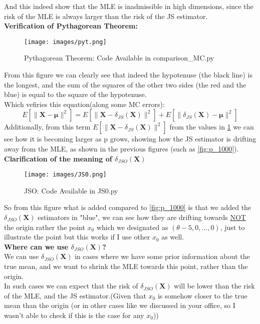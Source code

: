 \documentclass[12pt]{article}
\begin{document}
And this indeed show that the MLE is inadmissible in high dimensions, since the risk of the MLE is always larger than the risk of the JS estimator. \\
\textbf{Verification of Pythagorean Theorem:} \\
\begin{figure}[H]
  \centering 
  \texttt{[image: images/pyt.png]}
  \caption{Pythagorean Theorem: Code Available in comparison\_MC.py}
  \label{fig:pythagorean}
\end{figure}
From this figure we can clearly see that indeed the hypotenuse (the black line) is the longest, and the sum of the squares of the other two sides (the red and the blue) is equal to the square of the hypotenuse. \\ Which vefiries this equation(along some MC errors):
\[
E[\|\boldsymbol{X}-\boldsymbol{\mu}\|^2] = E[\|\boldsymbol{X}-\delta_{JS}(\boldsymbol{X})\|^2] + E[\|\delta_{JS}(\boldsymbol{X})-\boldsymbol{\mu}\|^2]
\]
Additionally, from this term $E[\|\boldsymbol{X}-\delta_{JS}(\boldsymbol{X})\|^2]$ from the values in \ref{fig:pythagorean} we can see how it is becoming larger as p grows, showing how the JS estimator is drifting away from the MLE, as shown in the previous figures (such as \ref{fig:p_1000}). \\ 
\textbf{Clarification of the meaning of $\delta_{JSO}(\boldsymbol{X})$}
\begin{figure}[H]
  \centering 
  \texttt{[image: images/JS0.png]}
  \caption{JSO: Code Available in JS0.py}
  \label{fig:jso}
\end{figure}
So from this figure what is added compared to \ref{fig:p_1000} is that we added the $\delta_{JSO}(\boldsymbol{X})$ estimators in "blue", we can see how they are drifting towards \underline{NOT} the origin rather the point $x_0$ which we designated as $(\theta-5, 0, ..., 0)$, just to illustrate the point but this works if I use other $x_0$ as well. \\ 
\textbf{Where can we use $\delta_{JSO}(\boldsymbol{X})$?} \\
We can use $\delta_{JSO}(\boldsymbol{X})$ in cases where we have some prior information about the true mean, and we want to shrink the MLE towards this point, rather than the origin. \\
In such cases we can expect that the risk of $\delta_{JSO}(\boldsymbol{X})$ will be lower than the risk of the MLE, and the JS estimator.(Given that $x_0$ is somehow closer to the true mean than the origin (or in other cases like we discussed in your office, so I wasn't able to check if this is the case for any $x_0$)) \\
\end{document}
